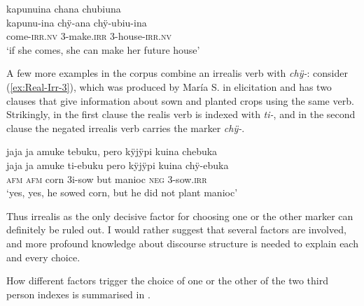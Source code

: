 \ea\label{ex:chi-house-irr}
\begingl
\glpreamble kapunuina chana chubiuna\\
\gla kapunu-ina chÿ-ana chÿ-ubiu-ina\\
\glb come-\textsc{irr.nv} 3-make.\textsc{irr} 3-house-\textsc{irr.nv}\\
\glft ‘if she comes, she can make her future house’
\endgl
\trailingcitation{[jxx-p120430l-1.298-299]}
\xe


A few more examples in the corpus combine an irrealis verb with \textit{chÿ-}: consider (\ref{ex:Real-Irr-3}), which was produced by María S. in elicitation and has two clauses that give information about sown and planted crops using the same verb. Strikingly, in the first clause the realis verb is indexed with \textit{ti-}, and in the second clause the negated irrealis verb carries the marker \textit{chÿ-}.

\ea\label{ex:Real-Irr-3}
\begingl
\glpreamble jaja ja amuke tebuku, pero kÿjÿpi kuina chebuka\\
\gla jaja ja amuke ti-ebuku pero kÿjÿpi kuina chÿ-ebuka\\
\glb \textsc{afm} \textsc{afm} corn 3i-sow but manioc \textsc{neg} 3-sow.\textsc{irr}\\
\glft ‘yes, yes, he sowed corn, but he did not plant manioc’
\endgl
\trailingcitation{[rxx-e181024l]}%
\xe

Thus irrealis as the only decisive factor for choosing one or the other marker can definitely be ruled out. I would rather suggest that several factors are involved, and more profound knowledge about discourse structure is needed to explain each and every choice.

How different factors trigger the choice of one or the other of the two third person indexes is summarised in .

